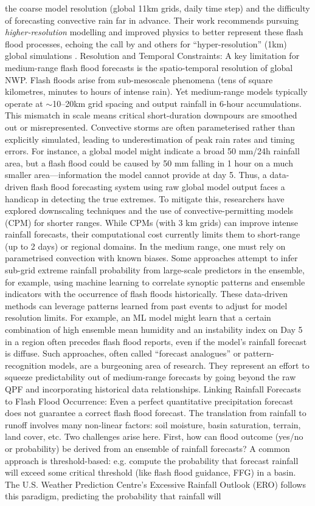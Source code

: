 the coarse model resolution (global 11km grids, daily time step) and the difficulty of forecasting convective rain far in advance. Their work recommends pursuing \emph{higher-resolution} modelling and improved physics to better represent these flash flood processes, echoing the call by \citet{Harrigan2023} and others for “hyper-resolution” (1km) global simulations \citep[e.g.][]{Harrigan2023}. Resolution and Temporal Constraints: A key limitation for medium-range flash flood forecasts is the spatio-temporal resolution of global NWP. Flash floods arise from sub-mesoscale phenomena (tens of square kilometres, minutes to hours of intense rain). Yet medium-range models typically operate at $\sim$10--20km grid spacing and output rainfall in 6-hour accumulations. This mismatch in scale means critical short-duration downpours are smoothed out or misrepresented. Convective storms are often parameterised rather than explicitly simulated, leading to underestimation of peak rain rates and timing errors. For instance, a global model might indicate a broad 50 mm/24h rainfall area, but a flash flood could be caused by 50 mm falling in 1 hour on a much smaller area—information the model cannot provide at day 5. Thus, a data-driven flash flood forecasting system using raw global model output faces a handicap in detecting the true extremes. To mitigate this, researchers have explored downscaling techniques and the use of convective-permitting models (CPM) for shorter ranges. While CPMs (with 3 km grids) can improve intense rainfall forecasts, their computational cost currently limits them to short-range (up to 2 days) or regional domains. In the medium range, one must rely on parametrised convection with known biases. Some approaches attempt to infer sub-grid extreme rainfall probability from large-scale predictors in the ensemble, for example, using machine learning to correlate synoptic patterns and ensemble indicators with the occurrence of flash floods historically. These data-driven methods can leverage patterns learned from past events to adjust for model resolution limits. For example, an ML model might learn that a certain combination of high ensemble mean humidity and an instability index on Day 5 in a region often precedes flash flood reports, even if the model’s rainfall forecast is diffuse. Such approaches, often called “forecast analogues” or pattern-recognition models, are a burgeoning area of research. They represent an effort to squeeze predictability out of medium-range forecasts by going beyond the raw QPF and incorporating historical data relationships. Linking Rainfall Forecasts to Flash Flood Occurrence: Even a perfect quantitative precipitation forecast does not guarantee a correct flash flood forecast. The translation from rainfall to runoff involves many non-linear factors: soil moisture, basin saturation, terrain, land cover, etc. Two challenges arise here. First, how can flood outcome (yes/no or probability) be derived from an ensemble of rainfall forecasts? A common approach is threshold-based: e.g. compute the probability that forecast rainfall will exceed some critical threshold (like flash flood guidance, FFG) in a basin. The U.S. Weather Prediction Centre’s Excessive Rainfall Outlook (ERO) follows this paradigm, predicting the probability that rainfall will 